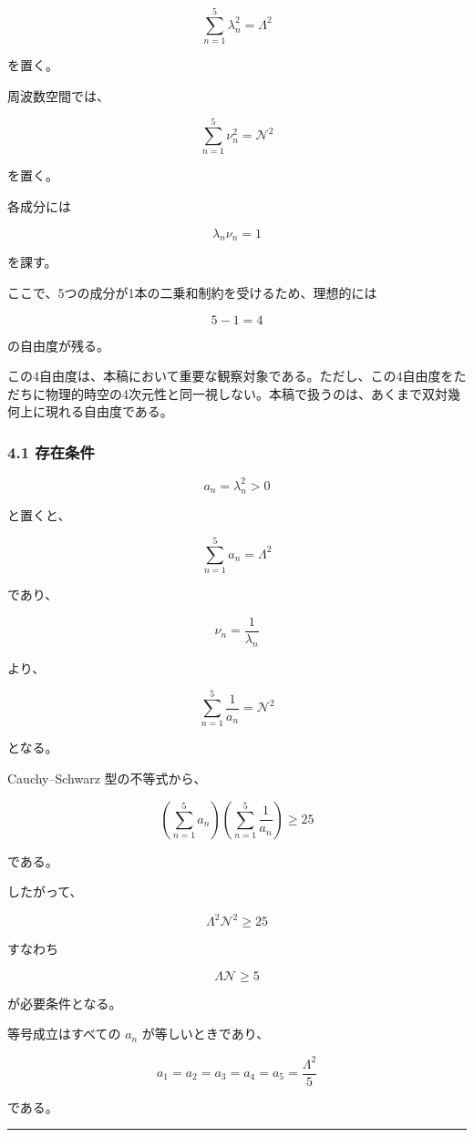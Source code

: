 \documentclass[
]{ltjsarticle}
\begin{document}
\[
\sum_{n=1}^{5} \lambda_n^2=\Lambda^2
\]

を置く。

周波数空間では、

\[
\sum_{n=1}^{5} \nu_n^2=\mathcal{N}^2
\]

を置く。

各成分には

\[
\lambda_n\nu_n=1
\]

を課す。

ここで、5つの成分が1本の二乗和制約を受けるため、理想的には

\[
5-1=4
\]

の自由度が残る。

この4自由度は、本稿において重要な観察対象である。ただし、この4自由度をただちに物理的時空の4次元性と同一視しない。本稿で扱うのは、あくまで双対幾何上に現れる自由度である。

\subsubsection{4.1 存在条件}\label{ux5b58ux5728ux6761ux4ef6}

\[
a_n=\lambda_n^2>0
\]

と置くと、

\[
\sum_{n=1}^{5} a_n=\Lambda^2
\]

であり、

\[
\nu_n=\frac{1}{\lambda_n}
\]

より、

\[
\sum_{n=1}^{5} \frac{1}{a_n}=\mathcal{N}^2
\]

となる。

Cauchy--Schwarz 型の不等式から、

\[
\left(\sum_{n=1}^{5} a_n\right)
\left(\sum_{n=1}^{5} \frac{1}{a_n}\right)\ge 25
\]

である。

したがって、

\[
\Lambda^2\mathcal{N}^2\ge 25
\]

すなわち

\[
\Lambda\mathcal{N}\ge 5
\]

が必要条件となる。

等号成立はすべての \(a_n\) が等しいときであり、

\[
a_1=a_2=a_3=a_4=a_5=\frac{\Lambda^2}{5}
\]

である。

\begin{center}\rule{0.5\linewidth}{0.5pt}\end{center}
\end{document}
